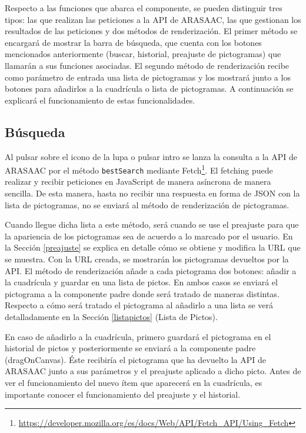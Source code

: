 Respecto a las funciones que abarca el componente, se pueden distinguir tres tipos: las que realizan las peticiones a la API de ARASAAC, las que gestionan los resultados de las peticiones y dos métodos de renderización. El primer método se encargará de mostrar la barra de búsqueda, que cuenta con los botones mencionados anteriormente (buscar, historial, preajuste de pictogramas) que llamarán a sus funciones asociadas. El segundo método de renderización recibe como parámetro de entrada una lista de pictogramas y los mostrará junto a los botones para añadirlos a la cuadrícula o lista de pictogramas. A continuación se explicará el funcionamiento de estas funcionalidades. 


\subsection{Búsqueda}

Al pulsar sobre el icono de la lupa o pulsar intro se lanza la consulta a la API de ARASAAC por el método \texttt{bestSearch} mediante Fetch\footnote{\url{https://developer.mozilla.org/es/docs/Web/API/Fetch_API/Using_Fetch}}. El fetching puede realizar y recibir peticiones en JavaScript de manera asíncrona de manera sencilla. De esta manera, hasta no recibir una respuesta en forma de JSON con la lista de pictogramas, no se enviará al método de renderización de pictogramas. 

Cuando llegue dicha lista a este método, será cuando se use el preajuste para que la apariencia de los pictogramas sea de acuerdo a lo marcado por el usuario. En la Sección \ref{preajuste} se explica en detalle cómo se obtiene y modifica la URL que se muestra. Con la URL creada, se mostrarán los pictogramas devueltos por la API. El método de renderización añade a cada pictograma dos botones: añadir a la cuadrícula y guardar en una lista de pictos. En ambos casos se enviará el pictograma a la componente padre donde será tratado de maneras distintas. Respecto a cómo será tratado el pictograma al añadirlo a una lista se verá detalladamente en la Sección \ref{listapictos} (Lista de Pictos).

En caso de añadirlo a la cuadrícula, primero guardará el pictograma en el historial de pictos y posteriormente se enviará a la componente padre (dragOnCanvas).  Éste recibiría el pictograma que ha devuelto la API de ARASAAC junto a sus parámetros y el preajuste aplicado a dicho picto. Antes de ver el funcionamiento del nuevo ítem que aparecerá en la cuadrícula, es importante conocer el funcionamiento del preajuste y el historial.


